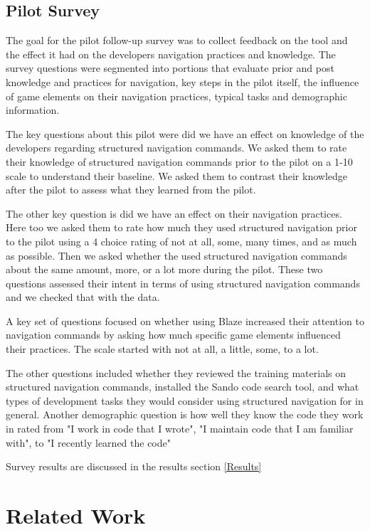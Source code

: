 \documentclass{sig-alternate}
\begin{document}
\subsection{Pilot Survey}

The goal for the pilot follow-up survey was to collect feedback on the tool and the effect it had on the developers navigation practices and knowledge.  The survey questions were segmented into portions that evaluate prior and post knowledge and practices for navigation, key steps in the pilot itself, the influence of game elements on their navigation practices, typical tasks and demographic information.

The key questions about this pilot were did we have an effect on knowledge of the developers regarding structured navigation commands.  We asked them to rate their knowledge of structured navigation commands prior to the pilot on a 1-10 scale to understand their baseline.  We asked them to contrast their knowledge after the pilot to assess what they learned from the pilot.

The other key question is did we have an effect on their navigation practices.  Here too we asked them to rate how much they used structured navigation prior to the pilot using a 4 choice rating of not at all, some, many times, and as much as possible.  Then we asked whether the used structured navigation commands about the same amount, more,  or a lot more during the pilot.  These two questions assessed their intent in terms of using structured navigation commands and we checked that with the data.

A key set of questions focused on whether using Blaze increased their attention to navigation commands by asking how much specific game elements influenced their practices.  The scale started with not at all, a little, some, to a lot.  

The other questions included whether they reviewed the training materials on structured navigation commands, installed the Sando code search tool, and what types of development tasks they would consider using structured navigation for in general.  Another demographic question is how well they know the code they work in rated from "I work in code that I wrote", "I maintain code that I am familiar with", to "I recently learned the code"

Survey results are discussed in the results section \ref{Results}

\section{Related Work}
\end{document}

